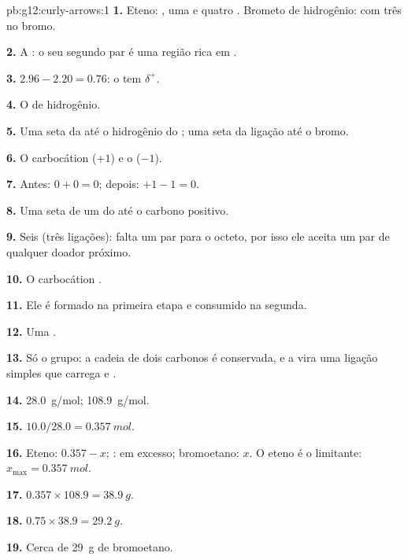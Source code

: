 \begin{solution}{pb:g12:curly-arrows:1}
\textbf{1.} Eteno: , uma  e quatro .
Brometo de hidrogênio:  com três  no bromo.

\textbf{2.} A : o seu segundo par é uma região rica em
.

\textbf{3.} $2.96 - 2.20 = 0.76$: o  tem $\delta^+$.

\textbf{4.} O  de hidrogênio.

\textbf{5.} Uma seta da  até o hidrogênio do ; uma
seta da ligação  até o bromo.

\textbf{6.} O carbocátion  ($+1$) e o  ($-1$).

\textbf{7.} Antes: $0 + 0 = 0$; depois: $+1 - 1 = 0$.

\textbf{8.} Uma seta de um  do  até o carbono
positivo.

\textbf{9.} Seis (três ligações): falta um par para o octeto, por isso
ele aceita um par de qualquer doador próximo.

\textbf{10.} O carbocátion .

\textbf{11.} Ele é formado na primeira etapa e consumido na segunda.

\textbf{12.} Uma .

\textbf{13.} Só o grupo: a cadeia de dois carbonos é conservada, e a
 vira uma ligação simples que carrega  e .

\textbf{14.} \qty{28.0}{g/mol}; \qty{108.9}{g/mol}.

\textbf{15.} $10.0 / 28.0 = \qty{0.357}{mol}$.

\textbf{16.} Eteno: $0.357 - x$; : em excesso; bromoetano: $x$.
O eteno é o limitante: $x_{\max} = \qty{0.357}{mol}$.

\textbf{17.} $0.357 \times 108.9 = \qty{38.9}{g}$.

\textbf{18.} $0.75 \times 38.9 = \qty{29.2}{g}$.

\textbf{19.} Cerca de \qty{29}{g} de bromoetano.
\end{solution}
